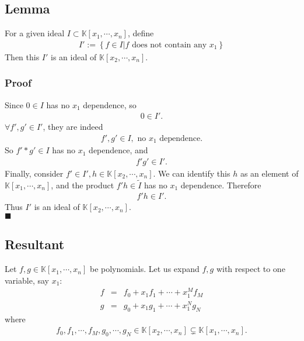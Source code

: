 \documentclass[11pt]{book}
\begin{document}
\subsection{Lemma}
\label{firstElimination}
For a given ideal $I \subset \mathbb{K}[x_1, \cdots, x_n] $, define
\begin{eqnarray}
I' := \left\{ \left. f \in I \right| f \text{ does not contain any $x_1$} \right\}
\end{eqnarray}
Then this $I'$ is an ideal of $\mathbb{K}[x_2, \cdots, x_n]$.

\subsubsection{Proof}
Since $0 \in I$ has no $x_1$ dependence, so
\begin{eqnarray}
0 \in I'.
\end{eqnarray}
$\forall f',g' \in I'$, they are indeed
\begin{eqnarray}
f', g' \in I, \text{ no $x_1$ dependence.}
\end{eqnarray}
So $f' * g' \in I$ has no $x_1$ dependence, and
\begin{eqnarray}
f'g' \in I'.
\end{eqnarray}
Finally, consider $f' \in I', h \in \mathbb{K}[x_2, \cdots, x_n]$.
We can identify this $h$ as an element of $\mathbb{K}[x_1, \cdots, x_n]$, and the product $f' h \in \tilde{I}$ has no $x_1$ dependence.
Therefore
\begin{eqnarray}
f' h \in I'.
\end{eqnarray}
Thus $I'$ is an ideal of $\mathbb{K}[x_2, \cdots, x_n]$. \\
$\blacksquare$

\subsection{Resultant}
Let $f,g \in \mathbb{K}[x_1, \cdots, x_n]$ be polynomials.
Let us expand $f,g$ with respect to one variable, say $x_1$:
\begin{eqnarray}
f &=& f_0 + x_1 f_1 + \cdots + x_1^M f_M \\
g &=& g_0 + x_1 g_1 + \cdots + x_1^N g_N 
\end{eqnarray}
where
\begin{eqnarray}
f_0,f_1,\cdots, f_M, g_0, \cdots, g_N \in\mathbb{K}[x_2, \cdots, x_n] \subsetneq \mathbb{K}[x_1, \cdots, x_n].
\end{eqnarray}
\end{document}
